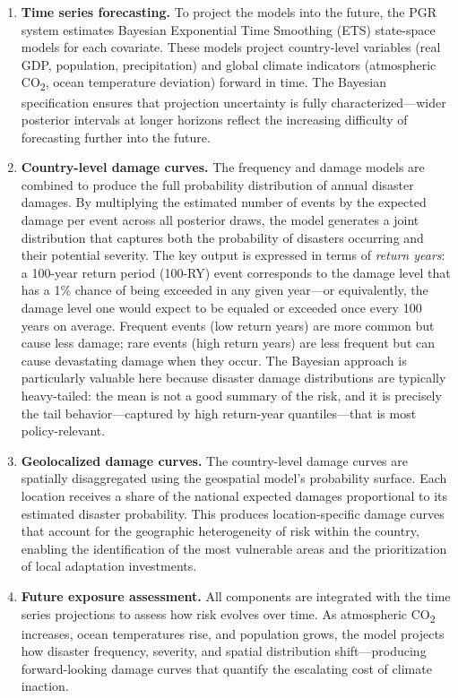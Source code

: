 \documentclass[11pt,a4paper]{article}
\begin{document}
\begin{enumerate}[leftmargin=2em]
  \item \textbf{Time series forecasting.} To project the models into the future, the PGR system estimates Bayesian Exponential Time Smoothing (ETS) state-space models for each covariate. These models project country-level variables (real GDP, population, precipitation) and global climate indicators (atmospheric CO\textsubscript{2}, ocean temperature deviation) forward in time. The Bayesian specification ensures that projection uncertainty is fully characterized---wider posterior intervals at longer horizons reflect the increasing difficulty of forecasting further into the future.

  \item \textbf{Country-level damage curves.} The frequency and damage models are combined to produce the full probability distribution of annual disaster damages. By multiplying the estimated number of events by the expected damage per event across all posterior draws, the model generates a joint distribution that captures both the probability of disasters occurring and their potential severity. The key output is expressed in terms of \textit{return years}: a 100-year return period (100-RY) event corresponds to the damage level that has a 1\% chance of being exceeded in any given year---or equivalently, the damage level one would expect to be equaled or exceeded once every 100 years on average. Frequent events (low return years) are more common but cause less damage; rare events (high return years) are less frequent but can cause devastating damage when they occur. The Bayesian approach is particularly valuable here because disaster damage distributions are typically heavy-tailed: the mean is not a good summary of the risk, and it is precisely the tail behavior---captured by high return-year quantiles---that is most policy-relevant.

  \item \textbf{Geolocalized damage curves.} The country-level damage curves are spatially disaggregated using the geospatial model's probability surface. Each location receives a share of the national expected damages proportional to its estimated disaster probability. This produces location-specific damage curves that account for the geographic heterogeneity of risk within the country, enabling the identification of the most vulnerable areas and the prioritization of local adaptation investments.

  \item \textbf{Future exposure assessment.} All components are integrated with the time series projections to assess how risk evolves over time. As atmospheric CO\textsubscript{2} increases, ocean temperatures rise, and population grows, the model projects how disaster frequency, severity, and spatial distribution shift---producing forward-looking damage curves that quantify the escalating cost of climate inaction.
\end{enumerate}
\end{document}

